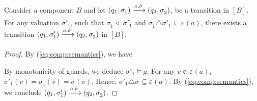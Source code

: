 \documentclass{llncs}
\newcommand{\eq}[1]{(\ref{eq:#1})}
\newcommand{\goesto}[2][]{\ensuremath{\xrightarrow[{#1}\relax]{#2}}}
\newcommand{\order}{<}
\newcommand{\val}[3][]{\ensuremath{#1{\sigma}^{#2}_{#3}}}
\newcommand{\primeit}[1]{#1'}
\newcommand{\export}[1][]{\ensuremath{\varepsilon_{#1}}}
\newcommand{\valdiff}[2]{\ensuremath{#1 \triangle #2}}
\newcommand{\semopen}[1]{\ensuremath{[{#1}]}}
\begin{document}
\begin{lemma}
  \label{lem:stepabove}
  Consider a component $B$ and let 
%
  $
  (q_1, \val{}{1})
%
  \goesto{a, \val[\tilde]{}{}}
%
  (q_2, \val{}{2})
  $,
%
  be a transition in $\semopen{B}$.  For any valuation
  $\val[\primeit]{}{1}$, such that
  $\val{}{1} \order \val[\primeit]{}{1}$ and
  $\valdiff{\val{}{1}}{\val[\primeit]{}{1}} \subseteq \export(a)$,
  there exists a transition
%
  $
  (q_1, \val[\primeit]{}{1})
%
  \goesto{a, \val[\tilde]{}{}}
%
  (q_2, \val{}{2})
  $
%
  in $\semopen{B}$.
\end{lemma}
%
\begin{proof}
  By \eq{comp:semantics}, we have
%

  By monotonicity of guards, we deduce
  $\val[\primeit]{}{1} \models g$.
  For any $v \not\in \export(a)$,
  $\val[\primeit]{}{1}(v) = \val{}{1}(v) = \val[\tilde]{}{}(v)$.
  Hence, 
  $\valdiff{\val[\primeit]{}{1}}{\val[\tilde]{}{}}
  \subseteq \export(a)$.
  By \eq{comp:semantics}, we conclude 
%
  $
  (q_1, \val[\primeit]{}{1})
%
  \goesto{a, \val[\tilde]{}{}}
%
  (q_2, \val{}{2})
  $.  
\end{proof}
\end{document}

